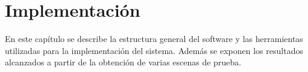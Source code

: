 \chapter{Implementación}

En este capítulo se describe la estructura general del software y las herramientas utilizadas para la implementación del sistema. Además se exponen los resultados alcanzados a partir de la obtención de varias escenas de prueba.
